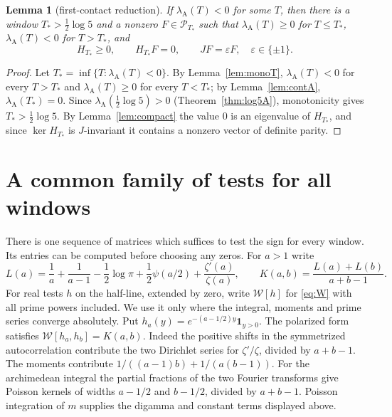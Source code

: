 \documentclass[11pt]{amsart}
\newtheorem{lemma}[theorem]{Lemma}
\theoremstyle{definition}
\theoremstyle{remark}
\newcommand{\lamA}{\lambda_{\mathrm A}(T)}
\begin{document}
\begin{lemma}[first-contact reduction]\label{lem:firstcontact}
If $\lamA<0$ for some $T$, then there is a window $T_*>\frac12\log5$ and a nonzero $F\in\mathcal P_{T_*}$ such
that $\lambda_{\mathrm A}(T)\ge0$ for $T\le T_*$, $\lambda_{\mathrm A}(T)<0$ for $T>T_*$, and
\[
 H_{T_*}\ge0,\qquad H_{T_*}F=0,\qquad JF=\varepsilon F,\quad \varepsilon\in\{\pm1\}.
\]
\end{lemma}
\begin{proof}
Let $T_*=\inf\{T:\lamA<0\}$. By Lemma~\ref{lem:monoT}, $\lamA<0$ for every $T>T_*$ and $\lamA\ge0$ for every
$T<T_*$; by Lemma~\ref{lem:contA}, $\lambda_{\mathrm A}(T_*)=0$. Since $\lambda_{\mathrm A}(\frac12\log5)>0$
(Theorem~\ref{thm:log5A}), monotonicity gives $T_*>\frac12\log5$. By Lemma~\ref{lem:compact} the value $0$ is
an eigenvalue of $H_{T_*}$, and since $\ker H_{T_*}$ is $J$-invariant it contains a nonzero vector of
definite parity.
\end{proof}
\section{A common family of tests for all windows}
There is one sequence of matrices which suffices to test the sign for every
window. Its entries can be computed before choosing any zeros. For $a>1$
write
\[
 L(a)=\frac1a+\frac1{a-1}-\frac12\log\pi+
 \frac12\psi(a/2)+\frac{\zeta'(a)}{\zeta(a)},\qquad
 K(a,b)=\frac{L(a)+L(b)}{a+b-1}.
\]
For real tests $h$ on the half-line, extended by zero, write $\mathcal W[h]$
for \eqref{eq:W} with all prime powers included. We use it only where
the integral, moments and prime series converge absolutely. Put
$h_a(y)=e^{-(a-1/2)y}\mathbf1_{y>0}$. The polarized form satisfies
$\mathcal W[h_a,h_b]=K(a,b)$. Indeed the positive shifts
in the symmetrized autocorrelation contribute the two Dirichlet series for
$\zeta'/\zeta$, divided by $a+b-1$. The moments contribute
$1/((a-1)b)+1/(a(b-1))$. For the archimedean integral the partial fractions
of the two Fourier transforms give Poisson kernels of widths $a-1/2$ and
$b-1/2$, divided by $a+b-1$. Poisson integration of $m$ supplies the
digamma and constant terms displayed above.
\end{document}
